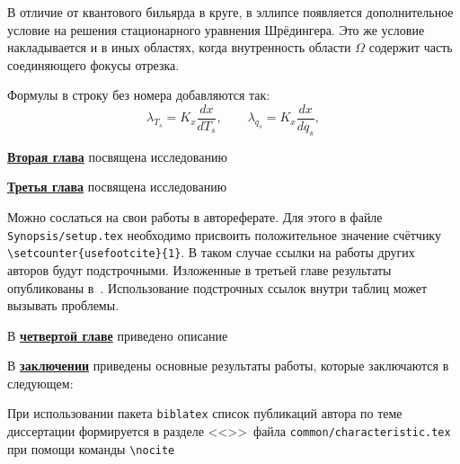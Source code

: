 В отличие от квантового бильярда в круге, в эллипсе появляется дополнительное условие на решения стационарного уравнения Шрёдингера. Это же условие накладывается и в иных областях, когда внутренность области $\Omega$ содержит часть соединяющего фокусы отрезка. 

Формулы в строку без номера добавляются так:
\[
    \lambda_{T_s} = K_x\frac{d{x}}{d{T_s}}, \qquad
    \lambda_{q_s} = K_x\frac{d{x}}{d{q_s}},
\]

\underline{\textbf{Вторая глава}} посвящена исследованию

\underline{\textbf{Третья глава}} посвящена исследованию

Можно сослаться на свои работы в автореферате. Для этого в файле
\verb!Synopsis/setup.tex! необходимо присвоить положительное значение
счётчику \verb!\setcounter{usefootcite}{1}!. В таком случае ссылки на
работы других авторов будут подстрочными.
Изложенные в третьей главе результаты опубликованы в~\cite{vakbib1, vakbib2}.
Использование подстрочных ссылок внутри таблиц может вызывать проблемы.

В \underline{\textbf{четвертой главе}} приведено описание

\FloatBarrier
{}                                  %
В \underline{\textbf{заключении}} приведены основные результаты работы, которые заключаются в следующем:


При использовании пакета \verb!biblatex! список публикаций автора по теме
диссертации формируется в разделе <<\publications>>\ файла
\verb!common/characteristic.tex!  при помощи команды \verb!\nocite!

